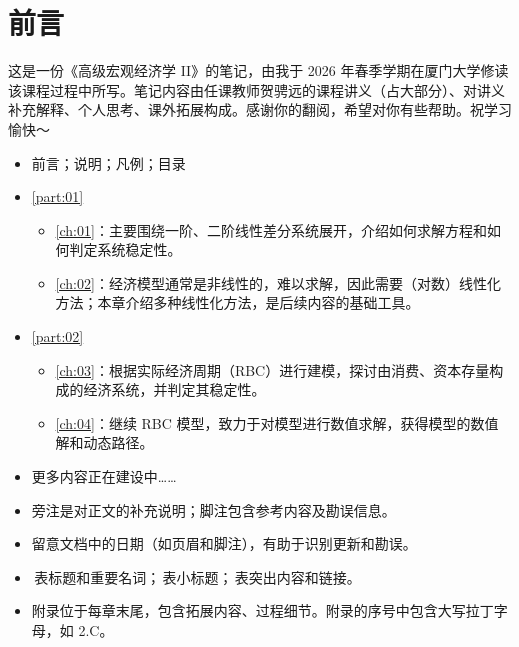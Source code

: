 \cleardoublepage
\pagestyle{symplain}
\thispagestyle{symplain}

\chapter*{前\hspace{1em}言}
\vspace{\baselineskip}


这是一份《高级宏观经济学 II》的笔记，由我于 2026 年春季学期在厦门大学修读该课程过程中所写。笔记内容由任课教师贺骋远的课程讲义（占大部分）、对讲义补充解释、个人思考、课外拓展构成。感谢你的翻阅，希望对你有些帮助。祝学习愉快～

\myskip
{}
\begin{itemize}
    \item 前言；说明；凡例；目录
    \item \ref{part:01}
        \begin{itemize}
            \item \ref{ch:01}：主要围绕一阶、二阶线性差分系统展开，介绍如何求解方程和如何判定系统稳定性。
            \item \ref{ch:02}：经济模型通常是非线性的，难以求解，因此需要（对数）线性化方法；本章介绍多种线性化方法，是后续内容的基础工具。
        \end{itemize}
    \item \ref{part:02}
        \begin{itemize}
            \item \ref{ch:03}：根据实际经济周期（RBC）进行建模，探讨由消费、资本存量构成的经济系统，并判定其稳定性。
            \item \ref{ch:04}：继续 RBC 模型，致力于对模型进行数值求解，获得模型的数值解和动态路径。
        \end{itemize}
    \item 更多内容正在建设中……
\end{itemize}

\newpage
{}

\begin{itemize}
    \item 旁注是对正文的补充说明；脚注包含参考内容及勘误信息。
    \item 留意文档中的日期（如页眉和脚注），有助于识别更新和勘误。
    \item {}\,表标题和重要名词；\,表小标题；\,表突出内容和链接。
    \item 附录位于每章末尾，包含拓展内容、过程细节。附录的序号中包含大写拉丁字母，如 2.C。
\end{itemize}

